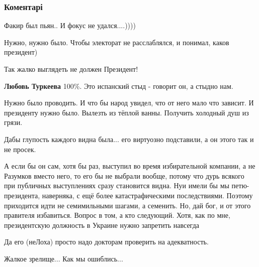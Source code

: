  
 
 
 
 
\subsubsection{Коментарі}
\label{sec:28_11_2021.fb.skarshevskij_viktor.1.prezident_snishozhdenie.cmt}

\begin{itemize} %
Факир был пьян..
И фокус не удался....))))

Нужно, нужно было.
Чтобы электорат не расслаблялся, и понимал, каков президент)

Так жалко выглядеть не должен Президент!

\textbf{Любовь Туркеева} 100\%. Это испанский стыд - говорит он, а стыдно нам.

Нужно было проводить. И что бы народ увидел, что от него мало что зависит. И президенту нужно было. Вылезть из тёплой ванны. Получить холодный душ из грязи.

Дабы глупость каждого видна была... его виртуозно подставили, а он этого так и не просек.


А если бы он сам, хотя бы раз, выступил во время избирательной компании, а не
Разумков вместо него, то его бы не выбрали вообще, потому что дурь всякого при
публичных выступлениях сразу становится видна. Нуи имели бы мы петю-президента,
наверняка, с ещё более катастрафическими последствиями. Поэтому приходится идти
не семимильными шагами, а семенить. Но, дай бог, и от этого правителя
избавиться. Вопрос в том, а кто следующий. Хотя, как по мне, президентскую
должность в Украине нужно запретить навсегда

Да его (неЛоха) просто надо докторам проверить на адекватность.

Жалкое зрелище...
Как мы ошиблись...

\end{itemize} %
